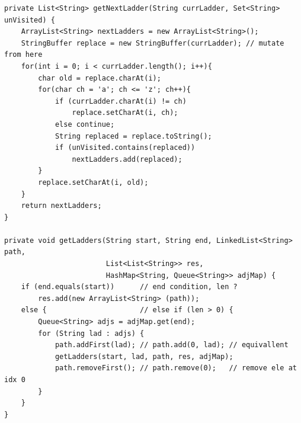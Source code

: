 \documentclass[12pt]{book}
\begin{document}
\lstset{language=java,label= ,caption= ,numbers=none}
\begin{lstlisting}
private List<String> getNextLadder(String currLadder, Set<String> unVisited) {
    ArrayList<String> nextLadders = new ArrayList<String>();
    StringBuffer replace = new StringBuffer(currLadder); // mutate from here
    for(int i = 0; i < currLadder.length(); i++){
        char old = replace.charAt(i);
        for(char ch = 'a'; ch <= 'z'; ch++){
            if (currLadder.charAt(i) != ch) 
                replace.setCharAt(i, ch);
            else continue;
            String replaced = replace.toString();
            if (unVisited.contains(replaced)) 
                nextLadders.add(replaced);
        }
        replace.setCharAt(i, old); 
    }
    return nextLadders;
}

private void getLadders(String start, String end, LinkedList<String> path,
                        List<List<String>> res,
                        HashMap<String, Queue<String>> adjMap) {
    if (end.equals(start))      // end condition, len ?
        res.add(new ArrayList<String> (path));   
    else {                      // else if (len > 0) {            
        Queue<String> adjs = adjMap.get(end);
        for (String lad : adjs) {
            path.addFirst(lad); // path.add(0, lad); // equivallent
            getLadders(start, lad, path, res, adjMap);
            path.removeFirst(); // path.remove(0);   // remove ele at idx 0
        }
    }
}


\end{lstlisting}
\end{document}
